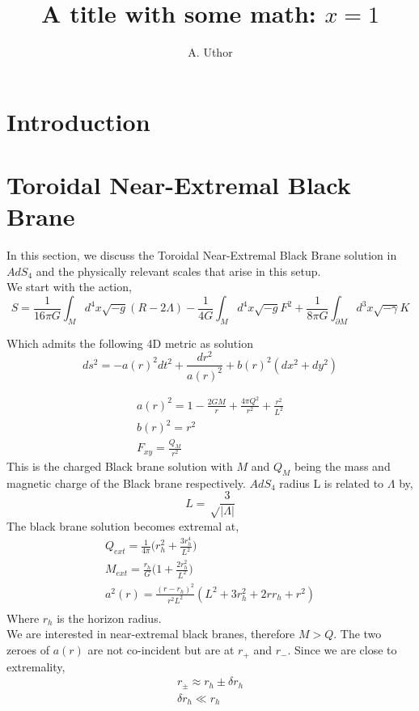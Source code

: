 \documentclass[a4paper,11pt]{article}
\title{\boldmath A title with some math: $x=1$}
\author{A. Uthor}
\affiliation{One University,\\
some-street, Country}
\affiliation{Another University,\\
different-address, Country}
\begin{document}
\maketitle
\flushbottom

\section{Introduction}
\label{sec:Introduction}

\section{Toroidal Near-Extremal Black Brane}
\label{sec:Toroidal Near-Extremal Black Brane}
In this section, we discuss the Toroidal Near-Extremal Black Brane solution in $AdS_4$ and the physically relevant scales that arise in this setup.\\

We start with the action,
\begin{equation}
    S=\frac{1}{16\pi G} \int_{ M} d^4x \sqrt{-g}(R-2\Lambda)-\frac{1}{4G}\int_{ M} d^4x \sqrt{-g}F^2 +\frac{1}{8\pi G}\int_{\partial M} d^3x \sqrt{-\gamma}K
\end{equation}

Which admits the following 4D metric as solution\\
\begin{equation}
    ds^2= -a(r)^2 dt^2 + \frac{dr^2}{a(r)^2} + b(r)^2(dx^2 +dy^2)
\end{equation}

\begin{align}
    a(r)^2=1-\frac{2GM}{r} + \frac{4\pi Q^2}{r^2} +\frac{r^2}{L^2}\\
    b(r)^2=r^2\\
    F_{xy}=\frac{Q_M}{r^2}
\end{align}
This is the charged Black brane solution with $M$ and $Q_M$ being the mass and magnetic charge of the Black brane respectively. $AdS_4$ radius L is related to $\Lambda$ by,
\begin{equation}
    L=\sqrt\frac{3}{|\Lambda|}
\end{equation}
The black brane solution becomes extremal at,\\
\begin{align}
    Q_{ext}=\frac{1}{4\pi}\big(r_h^2 +\frac{3r_h^4}{L^2}\big)\\
    M_{ext}=\frac{r_h}{G}\big(1 +\frac{2r_h^2}{L^2}\big)\\
    a^2(r)= \frac{(r-r_h)^2}{r^2L^2}(L^2 +3r_h^2+ 2rr_h+r^2)\\
\end{align}
Where $r_h$ is the horizon radius.\\    
We are interested in near-extremal black branes, therefore $M>Q$. The two zeroes of $a(r)$ are not co-incident but are at $r_+$ and $r_-$. Since we are close to extremality, 
\begin{align}
    r_\pm \approx r_h \pm \delta r_h \\
    \delta r_h \ll r_h \label{Eq: Near ext}
\end{align}
\end{document}
